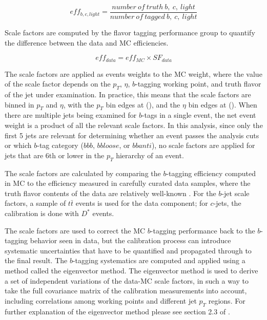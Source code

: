     \begin{equation}
        eff_{b,c,light}=\frac{number\ of\ truth\ b,\ c,\ light}{number\ of\ tagged\ b,\ c,\ light}
    \end{equation}

Scale factors are computed by the flavor tagging performance group to quantify the
difference between the data and MC efficiencies.

    \begin{equation}
        eff_{data}=eff_{MC}\times SF_{data}
    \end{equation}


The scale factors are applied as events weights to the MC weight, where the value
of the scale factor depends on the $p_T$, $\eta$, $b$-tagging working point, 
 and truth flavor of the jet under
examination.  In practice, this means that the scale factors are binned in $p_T$
and $\eta$, with the $p_T$ bin edges at (), and the $\eta$ bin edges at ().
When there are multiple jets being examined for $b$-tags in a single
event, the net event weight is a product of all the relevant scale factors.
In this analysis, since only the first 5 jets are relevant for determining 
whether an event passes the analysis cuts or which $b$-tag category ($bbb$, 
$bbloose$, or $bbanti$), no scale factors are applied for jets that are 6th
or lower in the $p_T$ hierarchy of an event.

The scale factors are calculated by comparing the $b$-tagging efficiency computed 
in MC to the efficiency measured in carefully curated data samples, where the truth
flavor contents of the data are relatively well-known \cite{b-tagging}.  For the $b$-jet
scale factors, a sample of $t\bar{t}$ events is used for the data component; for 
$c$-jets, the calibration is done with $D^*$ events.

The scale factors are used to correct the MC $b$-tagging performance back to the $b$-tagging
behavior seen in data, but the calibration process can introduce systematic uncertainties
that have to be quantified and propagated through to the final result.  The $b$-tagging
systematics are computed and applied using a method called the eigenvector method.
The eigenvector method is used to derive a set of independent variations of the data-MC scale
factors, in such a way to take the full covariance matrix of the calibration measurements
into account, including correlations among working points and different jet $p_{T}$ regions.
For further explanation of the eigenvector method please see section 2.3 of \cite{VHBTagging}. 


